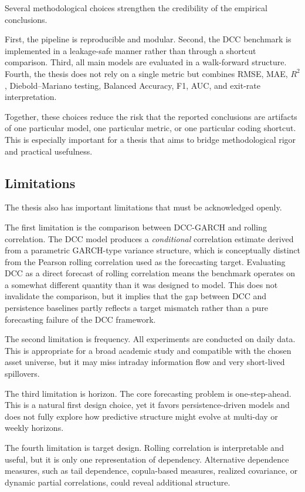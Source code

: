 Several methodological choices strengthen the credibility of the empirical conclusions.

First, the pipeline is reproducible and modular. Second, the DCC benchmark is implemented in a leakage-safe manner rather than through a shortcut comparison. Third, all main models are evaluated in a walk-forward structure. Fourth, the thesis does not rely on a single metric but combines RMSE, MAE, $R^2$, Diebold--Mariano testing, Balanced Accuracy, F1, AUC, and exit-rate interpretation.

Together, these choices reduce the risk that the reported conclusions are artifacts of one particular model, one particular metric, or one particular coding shortcut. This is especially important for a thesis that aims to bridge methodological rigor and practical usefulness.

\subsection{Limitations}

The thesis also has important limitations that must be acknowledged openly.

The first limitation is the comparison between DCC-GARCH and rolling correlation. The DCC model produces a \emph{conditional} correlation estimate derived from a parametric GARCH-type variance structure, which is conceptually distinct from the Pearson rolling correlation used as the forecasting target. Evaluating DCC as a direct forecast of rolling correlation means the benchmark operates on a somewhat different quantity than it was designed to model. This does not invalidate the comparison, but it implies that the gap between DCC and persistence baselines partly reflects a target mismatch rather than a pure forecasting failure of the DCC framework.

The second limitation is frequency. All experiments are conducted on daily data. This is appropriate for a broad academic study and compatible with the chosen asset universe, but it may miss intraday information flow and very short-lived spillovers.

The third limitation is horizon. The core forecasting problem is one-step-ahead. This is a natural first design choice, yet it favors persistence-driven models and does not fully explore how predictive structure might evolve at multi-day or weekly horizons.

The fourth limitation is target design. Rolling correlation is interpretable and useful, but it is only one representation of dependency. Alternative dependence measures, such as tail dependence, copula-based measures, realized covariance, or dynamic partial correlations, could reveal additional structure.

